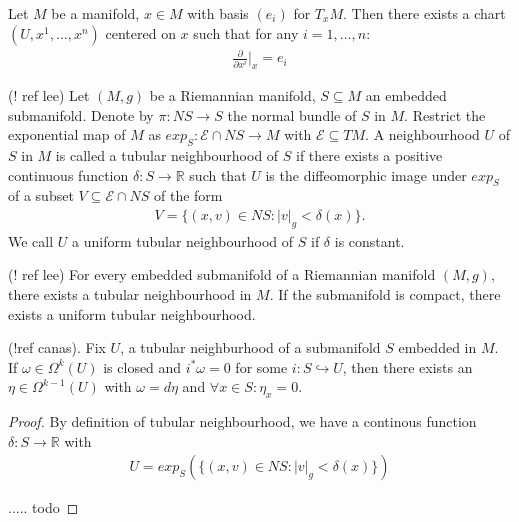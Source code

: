 \begin{lemma}\label{auxprop1}
Let $M$ be a manifold, $x \in M$ with basis $(e_i)$ for $T_x M$. Then there exists a chart $(U, x^1, ... ,x^n)$ centered on $x$ such that for any $i = 1, ... , n$:
\begin{align*}
\frac{\partial}{\partial x^i} \bigg\vert_x = e_i
\end{align*}
\end{lemma}

\begin{definition}
(! ref lee)
Let $(M,g)$  be a Riemannian manifold, $S \subseteq M$ an embedded submanifold. Denote by $\pi : NS \to S$ the normal bundle of $S$ in $M$. Restrict the exponential map of $M$ as $exp_S : \mathcal{E} \cap NS \to M$ with $\mathcal{E} \subseteq TM$. A neighbourhood $U$ of $S$ in $M$ is called a tubular neighbourhood of $S$ if there exists a positive continuous function $\delta : S \to \mathbb{R}$ such that $U$ is the diffeomorphic image under $exp_S$ of a subset $V \subseteq \mathcal{E} \cap NS$ of the form 
\begin{align*}
V = \{ (x,v) \in NS : |v|_g < \delta(x) \} .
\end{align*}
We call $U$ a uniform tubular neighbourhood of $S$ if $\delta$ is constant.
\end{definition}

\begin{theorem} \label{extub}
(! ref lee)
For every embedded submanifold of a Riemannian manifold $(M,g)$, there exists a tubular neighbourhood in $M$. If the submanifold is compact, there exists a uniform tubular neighbourhood.
\end{theorem}

\begin{proposition} \label{homoform} (!ref canas).
Fix $U$, a tubular neighburhood of a submanifold $S$ embedded in $M$. If $\omega \in \Omega^k(U)$ is closed and $i^* \omega = 0$ for some $i : S \hookrightarrow U$, then there exists an $\eta \in \Omega^{k-1}(U)$ with $\omega = d\eta$ and $\forall x \in S: \eta_x = 0$.
\end{proposition}

\begin{proof}
By definition of tubular neighbourhood, we have a continous function $\delta : S \to \mathbb{R}$ with 
\begin{align*}
U = exp_S(\{ (x,v) \in NS : |v|_g < \delta(x) \})
\end{align*}

..... todo

\end{proof}

